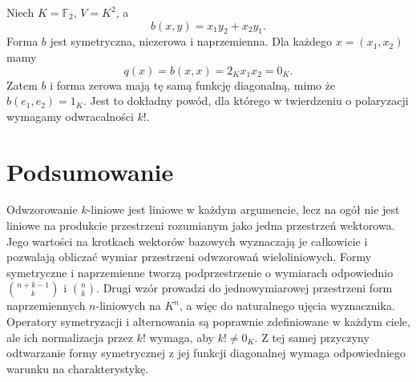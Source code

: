 \begin{przyklad}
\label{prz:lin8-diagonalna-char2}
Niech \(K=\mathbb F_2\),
\(V=K^2\), a
\[
 b(x,y)=x_1y_2+x_2y_1.
\]
Forma \(b\) jest symetryczna,
niezerowa i naprzemienna.
Dla każdego \(x=(x_1,x_2)\)
mamy
\[
 q(x)=b(x,x)=2_Kx_1x_2=0_K.
\]
Zatem \(b\) i forma zerowa
mają tę samą funkcję diagonalną,
mimo że \(b(e_1,e_2)=1_K\).
Jest to dokładny powód,
dla którego w twierdzeniu
o polaryzacji wymagamy
odwracalności \(k!\).
\end{przyklad}

\section{Podsumowanie}
\label{sec:lin8-podsumowanie}

Odwzorowanie \(k\)-liniowe
jest liniowe w każdym argumencie,
lecz na ogół nie jest liniowe
na produkcie przestrzeni
rozumianym jako jedna
przestrzeń wektorowa.
Jego wartości na krotkach
wektorów bazowych wyznaczają
je całkowicie i pozwalają
obliczać wymiar przestrzeni
odwzorowań wieloliniowych.
Formy symetryczne i naprzemienne
tworzą podprzestrzenie
o wymiarach odpowiednio
\(\binom{n+k-1}{k}\) i
\(\binom{n}{k}\).
Drugi wzór prowadzi do
jednowymiarowej przestrzeni
form naprzemiennych
\(n\)-liniowych na \(K^n\),
a więc do naturalnego ujęcia
wyznacznika.
Operatory symetryzacji i alternowania
są poprawnie zdefiniowane
w każdym ciele, ale ich normalizacja
przez \(k!\) wymaga, aby
\(k!\ne0_K\).
Z tej samej przyczyny odtwarzanie
formy symetrycznej z jej funkcji
diagonalnej wymaga odpowiedniego
warunku na charakterystykę.
